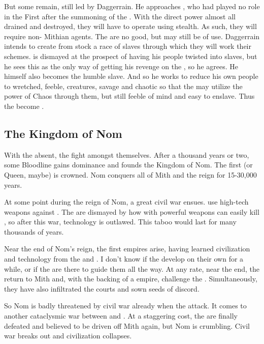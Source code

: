But some \banes{} remain, still led by Daggerrain. He approaches \Semiza{}, who had played no role in the First \Banewar{} after the summoning of the \banes{}. With the direct power almost all drained and destroyed, they will have to operate using stealth. As such, they will require non-\bane{} Mithian agents. The \nephilim{} are no good, but may still be of use. Daggerrain intends to create from \nephil{} stock a race of slaves through which they will work their schemes. \Semiza{} is dismayed at the prospect of having his people twisted into \bane{} slaves, but he sees this as the only way of getting his revenge on the \dragons{}, so he agrees. He himself also becomes the \banesz{} humble slave. And so he works to reduce his own people to wretched, feeble, creatures, savage and chaotic so that the \banes{} may utilize the power of Chaos through them, but still feeble of mind and easy to enslave. Thus the \nephilim{} become \humans{}. 

\subsection{The \Dragon{} Kingdom of Nom}
With the \Dominators{} absent, the \dragons{} fight amongst themselves. After a thousand years or two, some Bloodline gains dominance and founds the \Dragon{} Kingdom of Nom. The first \DragonKing{} (or Queen, maybe) is crowned. Nom conquers all of Mith and the \DragonKings{} reign for 15-30,000 years. 

At some point during the reign of Nom, a great civil war ensues. \Scathae{} use high-tech weapons against \dragons{}. The \dragonlords{} are dismayed by how \scathae{} with powerful weapons can easily kill \dragons{}, so after this war, technology is outlawed. This taboo would last for many thousands of years. 

Near the end of Nom's reign, the first \human{} empires arise, having learned civilization and technology from the \dragons{} and \scathae{}. I don't know if the \humans{} develop on their own for a while, or if the \banes{} are there to guide them all the way. At any rate, near the end, the \banes{} return to Mith and, with the backing of a \human{} empire, challenge the \dragons{}. Simultaneously, they have also infiltrated the \draconic{} courts and sown seeds of discord. 

So Nom is badly threatened by civil war already when the \banes{} attack. It comes to another cataclysmic war between \dragons{} and \banes{}. At a staggering cost, the \banes{} are finally defeated and believed to be driven off Mith again, but Nom is crumbling. Civil war breaks out and civilization collapses. 





